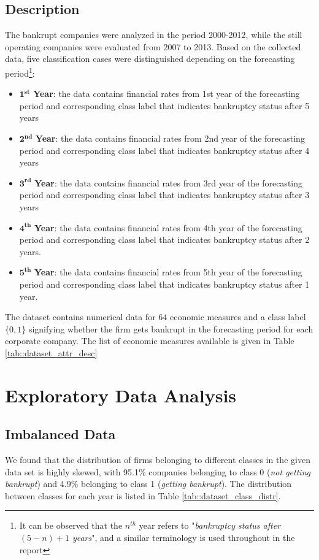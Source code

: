 \documentclass[11pt,a4paper]{article}
\begin{document}
\subsection{Description}
The bankrupt companies were analyzed in the period 2000-2012, while the still operating companies were evaluated from 2007 to 2013. 
Based on the collected data, five classification cases were distinguished depending on the forecasting period\footnote{It can be observed that the $n^{th}$ year refers to "\textit{bankruptcy status after $\mathit{(5-n)+1}$ years}", and a similar terminology is used throughout in the report}:
\begin{itemize}
    \item $\mathbf{1^{st}}$ \textbf{Year}: the data contains financial rates from 1st year of the forecasting period and corresponding class label that indicates bankruptcy status after 5 years
    \item $\mathbf{2^{nd}}$ \textbf{Year}: the data contains financial rates from 2nd year of the forecasting period and corresponding class label that indicates bankruptcy status after 4 years
    \item $\mathbf{3^{rd}}$ \textbf{Year}: the data contains financial rates from 3rd year of the forecasting period and corresponding class label that indicates bankruptcy status after 3 years
    \item $\mathbf{4^{th}}$ \textbf{Year}: the data contains financial rates from 4th year of the forecasting period and corresponding class label that indicates bankruptcy status after 2 years.
    \item $\mathbf{5^{th}}$ \textbf{Year}: the data contains financial rates from 5th year of the forecasting period and corresponding class label that indicates bankruptcy status after 1 year.
\end{itemize}

The dataset contains numerical data for $64$ economic measures and a class label $\{0,1\}$ signifying whether the firm gets bankrupt in the forecasting period for each corporate company. The list of economic measures available is given in Table \ref{tab::dataset_attr_desc} 



\section{Exploratory Data Analysis}
\subsection{Imbalanced Data}
\label{sec::imbalance}
We found that the distribution of firms belonging to different classes in the given data set is highly skewed, with 95.1\% companies belonging to class 0 (\textit{not getting bankrupt}) and 4.9\% belonging to class 1 (\textit{getting bankrupt}). The distribution between classes for each year is listed in Table \ref{tab::dataset_class_distr}.
\end{document}
